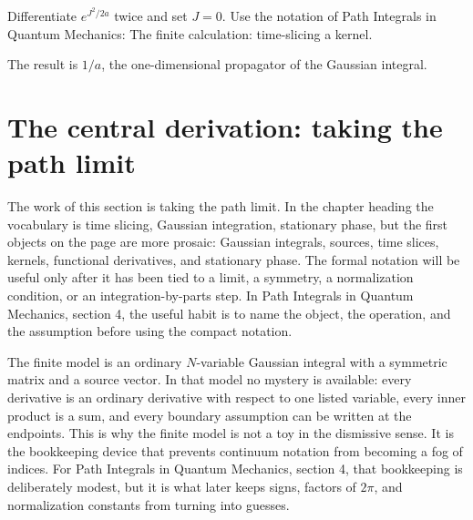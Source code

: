 \begin{exercise}
Differentiate \(e^{J^2/2a}\) twice and set \(J=0\).  Use the notation of Path Integrals in Quantum Mechanics: The finite calculation: time-slicing a kernel.
\begin{answer}
The result is \(1/a\), the one-dimensional propagator of the Gaussian integral.
\end{answer}
\end{exercise}



\section{The central derivation: taking the path limit}













The work of this section is taking the path limit.  In the chapter heading the vocabulary is time slicing, Gaussian integration, stationary phase, but the first objects on the page are more prosaic: Gaussian integrals, sources, time slices, kernels, functional derivatives, and stationary phase.  The formal notation will be useful only after it has been tied to a limit, a symmetry, a normalization condition, or an integration-by-parts step.  In Path Integrals in Quantum Mechanics, section 4, the useful habit is to name the object, the operation, and the assumption before using the compact notation.

The finite model is an ordinary \(N\)-variable Gaussian integral with a symmetric matrix and a source vector.  In that model no mystery is available: every derivative is an ordinary derivative with respect to one listed variable, every inner product is a sum, and every boundary assumption can be written at the endpoints.  This is why the finite model is not a toy in the dismissive sense.  It is the bookkeeping device that prevents continuum notation from becoming a fog of indices.  For Path Integrals in Quantum Mechanics, section 4, that bookkeeping is deliberately modest, but it is what later keeps signs, factors of \(2\pi\), and normalization constants from turning into guesses.

